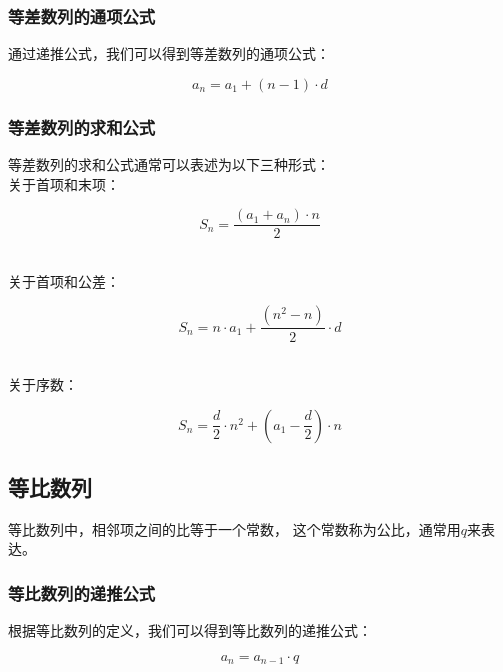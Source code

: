 \documentclass[UTF8]{ctexart}
\begin{document}
\subsubsection{等差数列的通项公式}
    通过递推公式，我们可以得到等差数列的通项公式：
    \begin{large}
    \begin{equation*}
        a_n=a_1+(n-1)\cdot d
    \end{equation*}
    \end{large}

\subsubsection{等差数列的求和公式}
    等差数列的求和公式通常可以表述为以下三种形式：\\[4mm]
    关于首项和末项：
    \begin{large}
    \begin{equation*}
        S_n=\frac{(a_1+a_n)\cdot n}{2}
    \end{equation*}
    \end{large}\\
    关于首项和公差：
    \begin{large}
    \begin{equation*}
        S_n=n\cdot a_1+\frac{(n^2-n)}{2}\cdot d
    \end{equation*}
    \end{large}\\
    关于序数：
    \begin{large}
    \begin{equation*}
        S_n=\frac{d}{2}\cdot n^2+(a_1-\frac{d}{2})\cdot n
    \end{equation*}
    \end{large}

\newpage

\subsection{等比数列}
    等比数列中，相邻项之间的比等于一个常数，
    这个常数称为公比，通常用$q$来表达。

\subsubsection{等比数列的递推公式}
    根据等比数列的定义，我们可以得到等比数列的递推公式：
    \begin{large}
    \begin{equation*}
        a_n=a_{n-1}\cdot q
    \end{equation*}    
    \end{large}
\end{document}
